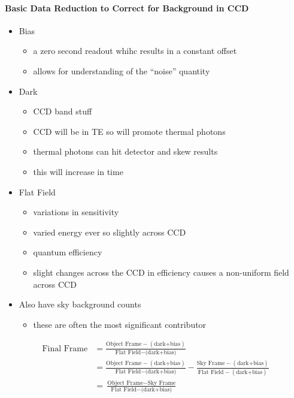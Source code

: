 \documentclass[a4paper,11pt,normalem]{article}
\begin{document}
\paragraph{Basic Data Reduction to Correct for Background in
CCD}
\begin{itemize}
    \item Bias
        \begin{itemize}
            \item a zero second readout whihc results in a constant offset
            \item allows for understanding of the ``noise'' quantity
        \end{itemize}
    \item Dark
        \begin{itemize}
            \item CCD band stuff
            \item CCD will be in TE so will promote thermal photons
            \item thermal photons can hit detector and skew results
            \item this will increase in time
        \end{itemize}
    \item Flat Field
        \begin{itemize}
            \item variations in sensitivity
            \item varied energy ever so slightly across CCD
            \item quantum efficiency
            \item slight changes across the CCD in efficiency causes a non-uniform field across CCD
        \end{itemize}
    \item Also have sky background counts
        \begin{itemize}
            \item these are often the most significant contributor
        \end{itemize}
\end{itemize}
\begin{align*}
    \text{Final Frame} &= \frac{\text{Object Frame} - (\text{dark+bias})}{\text{Flat Field} - \text{(dark+bias)}} \\
                       &= \frac{\text{Object Frame} - (\text{dark+bias})}{\text{Flat Field} - \text{(dark+bias)}} - \frac{\text{Sky Frame} - (\text{dark+bias})}{\text{Flat Field} - (\text{dark+bias})} \\
                       &= \frac{\text{Object Frame} - \text{Sky Frame}}{\text{Flat Field} - \text{(dark+bias)}}
\end{align*}
\end{document}
